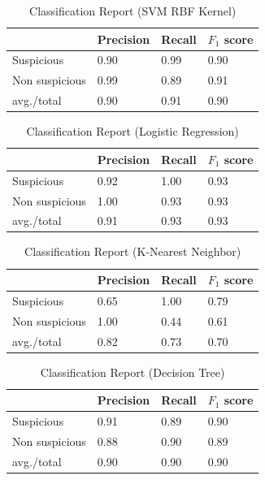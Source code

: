 \begin{table}[h!]
\begin{center}
\caption{Classification Report (SVM RBF Kernel)}
\begin{tabular}{|m{2.8cm} | m{1.5cm}| m{1.3cm}| m{1.5cm}|}
\hline
     & Precision & Recall & $F_1$ score\\
\hline
     Suspicious & 0.90 & 0.99 & 0.90\\
\hline 
     Non suspicious  & 0.99 & 0.89 & 0.91\\
\hline 
     avg./total & 0.90 & 0.91 & 0.90\\
\hline
\end{tabular}
\label{SVMR}
\end{center}
\end{table}

\begin{table}[h!]
\begin{center}
\caption{Classification Report (Logistic Regression)}
\begin{tabular}{|m{2.8cm} | m{1.5cm}| m{1.3cm}| m{1.5cm}|}
\hline
     & Precision & Recall & $F_1$ score\\
\hline
     Suspicious & 0.92 & 1.00 & 0.93\\
\hline 
     Non suspicious  & 1.00 & 0.93 & 0.93\\
\hline 
     avg./total & 0.91 & 0.93 & 0.93\\
\hline
\end{tabular}
\label{lr}
\end{center}
\end{table}

\begin{table}[h!]
\begin{center}
\caption{Classification Report (K-Nearest Neighbor)}
\begin{tabular}{|m{2.8cm} | m{1.5cm}| m{1.3cm}| m{1.5cm}|}
\hline
     & Precision & Recall & $F_1$ score\\
\hline
     Suspicious & 0.65 & 1.00 & 0.79\\
\hline 
     Non suspicious  & 1.00 & 0.44 & 0.61\\
\hline 
     avg./total & 0.82 & 0.73 & 0.70\\
\hline
\end{tabular}
\label{tknn}
\end{center}
\end{table}

\begin{table}[h!]
\begin{center}
\caption{Classification Report (Decision Tree)}
\begin{tabular}{|m{2.8cm} | m{1.5cm}| m{1.3cm}| m{1.5cm}|}
\hline
     & Precision & Recall & $F_1$ score\\
\hline
     Suspicious & 0.91 & 0.89 & 0.90\\
\hline 
     Non suspicious  & 0.88 & 0.90 & 0.89\\
\hline 
     avg./total & 0.90 & 0.90 & 0.90\\
\hline
\end{tabular}
\label{tdct}
\end{center}
\end{table}

